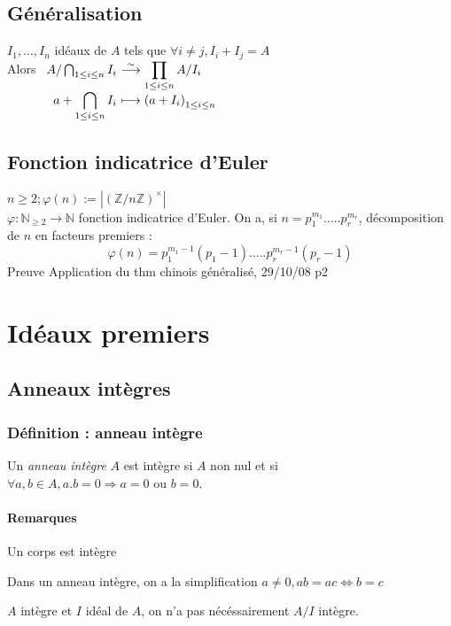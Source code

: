 \documentclass[reqno,a4paper,10pt]{report}
\makeatletter
\newcommand{\IZ}{\ensuremath{\mathbb{Z}}\xspace} %
\newcommand{\IN}{\ensuremath{\mathbb{N}}\xspace} %
\newcommand{\soo}{\Longrightarrow}
\let\olditemize=\itemize%
\renewenvironment{itemize}{%
    \olditemize%
  }{%
    \@noparlisttrue%
    \endlist%
  }%
\makeatother
\begin{document}
\subsection{Généralisation}
$I_1, \dots, I_n$ idéaux de $A$ tels que $\forall i \neq j, I_i + I_j = A$\\
Alors $
\begin{array}[t]{r@{\ }l}
  A/\bigcap_{1\leq i \leq n} I_i &\displaystyle
  \overset{\sim}{\longrightarrow} \prod_{1 \leq i\leq n} A/I_i\\
  \displaystyle a+\bigcap_{1\leq i \leq n} I_i &\displaystyle \longmapsto
  \left( a+I_i \right)_{1\leq i \leq n}
\end{array}
$

\subsection{Fonction indicatrice d'Euler}
$n\geq 2; \varphi(n):=|(\IZ/n\IZ)^\times|$\\
$\varphi:\IN_{\geq 2} \longrightarrow \IN$ fonction indicatrice d'Euler.
On a, si $n=p_1^{m_1}. \dots . p_r^{m_r}$, décomposition de $n$ en facteurs
premiers :
\[\varphi(n)=p_1^{m_1-1}(p_1 - 1). \dots . p_r^{m_r-1}(p_r-1)\]
  Preuve Application du thm chinois généralisé, 29/10/08 p2

\section{Idéaux premiers}
\subsection{Anneaux intègres}
\subsubsection{Définition : anneau intègre}
Un \emph{anneau intègre} $A$ est intègre si $A$ non nul et si\\
$\forall a,b \in A, a.b = 0 \soo a=0$ ou $b=0$.

\paragraph{Remarques}
\begin{itemize}
  \item Un corps est intègre
  \item Dans un anneau intègre, on a la simplification $a\neq 0, ab=ac
    \iff b=c$
  \item $A$ intègre et $I$ idéal de $A$, on n'a pas nécéssairement $A/I$
    intègre.
\end{itemize}
\end{document}
